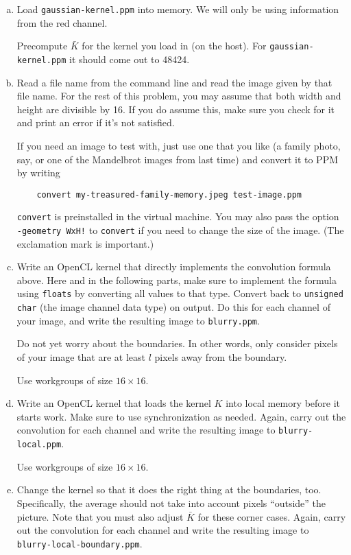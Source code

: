 \documentclass[11pt]{article}
\begin{document}
\begin{enumerate}[a)]
  \item Load \texttt{gaussian-kernel.ppm} into memory. We will only be
    using information from the red channel.

    Precompute $\bar K$ for the kernel you load in (on the host). For
    \texttt{gaussian-kernel.ppm} it should come out to 48424.

  \item Read a file name from the command line and read the image
    given by that file name. For the rest of this problem, you may
    assume that both width and height are divisible by 16. If you do
    assume this, make sure you check for it and print an error if it's
    not satisfied.

    If you need an image to test with, just use one that you like (a
    family photo, say, or one of the Mandelbrot images from last time)
    and convert it to PPM by writing
    \begin{lstlisting}
    convert my-treasured-family-memory.jpeg test-image.ppm
    \end{lstlisting}
    \texttt{convert} is preinstalled in the virtual machine. You may
    also pass the option \texttt{-geometry WxH!} to \texttt{convert}
    if you need to change the size of the image. (The exclamation
    mark is important.)

  \item Write an OpenCL kernel that directly implements the
    convolution formula above. Here and in the following parts, make
    sure to implement the formula using \texttt{floats} by converting
    all values to that type.  Convert back to \texttt{unsigned char}
    (the image channel data type) on output. Do this for each channel
    of your image, and write the resulting image to
    \texttt{blurry.ppm}.

    Do not yet worry about the boundaries. In other words, only consider
    pixels of your image that are at least $l$ pixels away from the
    boundary.

    Use workgroups of size $16\times 16$.
  \item Write an OpenCL kernel that loads the kernel $K$ into local
    memory before it starts work. Make sure to use synchronization as
    needed. Again, carry out the convolution for each channel
    and write the resulting image to \texttt{blurry-local.ppm}.

    Use workgroups of size $16\times 16$.

  \item Change the kernel so that it does the right thing at the
    boundaries, too. Specifically, the average should not take into
    account pixels ``outside'' the picture. Note that you must also
    adjust $\bar K$ for these corner cases. Again, carry out the 
    convolution for each channel
    and write the resulting image to \texttt{blurry-local-boundary.ppm}.


\end{enumerate}
\end{document}
